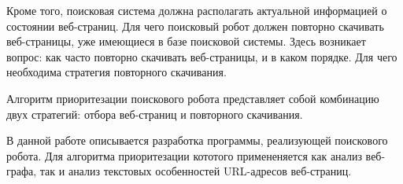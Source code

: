 Кроме того, поисковая система должна располагать актуальной информацией о состоянии веб-страниц. Для чего поисковый робот должен повторно скачивать веб-страницы, уже имеющиеся в базе поисковой системы. Здесь возникает вопрос: как часто повторно скачивать веб-страницы, и в каком порядке. Для чего необходима стратегия повторного скачивания.

Алгоритм приоритезации поискового робота представляет собой комбинацию двух стратегий: отбора веб-страниц и повторного скачивания.

В данной работе описывается разработка программы, реализующей поискового робота. Для алгоритма приоритезации кототого примененяется как анализ веб-графа, так и анализ текстовых особенностей URL-адресов веб-страниц.

